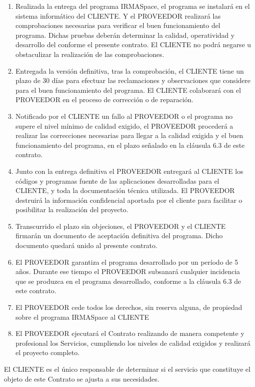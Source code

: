\begin{description}[style=nextline]
\begin{enumerate}
\begin{enumerate}
  	\item Realizada la entrega del programa IRMASpace, el programa se instalará en el sistema informático del CLIENTE. Y el PROVEEDOR realizará las comprobaciones necesarias para verificar el buen funcionamiento del programa. Dichas pruebas deberán determinar la calidad, operatividad y desarrollo del conforme el presente contrato. El CLIENTE no podrá negarse u obstaculizar la realización de las comprobaciones.
  \item Entregada la versión definitiva, tras la comprobación, el CLIENTE tiene un plazo de 30 días para efectuar las reclamaciones y observaciones que considere para el buen funcionamiento del programa. El CLIENTE colaborará con el PROVEEDOR en el proceso de corrección o de reparación.
  \item Notificado por el CLIENTE un fallo al PROVEEDOR o el programa no supere el nivel mínimo de calidad exigido, el PROVEEDOR procederá a realizar las correcciones necesarias para llegar a la calidad exigida y el buen funcionamiento del programa, en el plazo señalado en la cláusula 6.3 de este contrato.
  \item Junto con la entrega definitiva el PROVEEDOR  entregará al CLIENTE los códigos y programas fuente de las aplicaciones desarrolladas para el CLIENTE, y toda la documentación técnica utilizada. El PROVEEDOR destruirá la información confidencial aportada por el cliente para facilitar o posibilitar la realización del proyecto.
  \item Transcurrido el plazo sin objeciones, el PROVEEDOR y el CLIENTE firmarán un documento de aceptación definitiva del programa. Dicho documento quedará unido al presente contrato.
  \item El PROVEEDOR garantiza el programa desarrollado por un período de 5 años. Durante ese tiempo el PROVEEDOR subsanará cualquier incidencia que se produzca en el programa desarrollado, conforme a la cláusula 6.3 de este contrato.
  \item El PROVEEDOR cede todos los derechos, sin reserva alguna, de propiedad sobre el programa IRMASpace al CLIENTE
  \item  El PROVEEDOR ejecutará el Contrato realizando de manera competente y profesional los Servicios, cumpliendo los niveles de calidad exigidos y realizará el proyecto completo.
  \end{enumerate}
\end{enumerate}

\item[TERCERA.- POLÍTICA DE USO]
 \par El CLIENTE  es el único responsable de determinar si el servicio que constituye el objeto de este Contrato se ajusta a sus necesidades.


\end{description}
